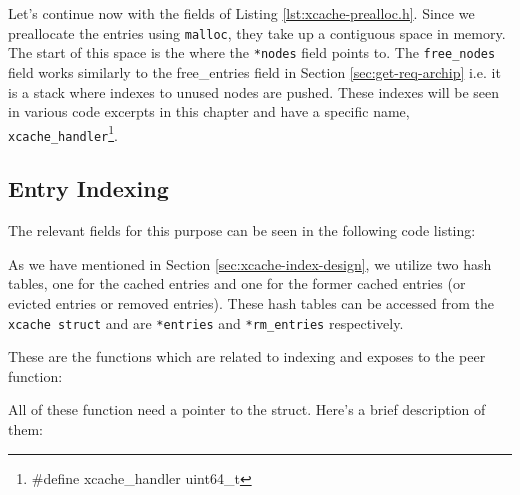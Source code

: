 Let's continue now with the fields of Listing \ref{lst:xcache-prealloc.h}.  
Since we preallocate the entries using \texttt{malloc}, they take up a 
contiguous space in memory.  The start of this space is the where the 
\texttt{*nodes} field points to. The \texttt{free\_nodes} field works similarly 
to the free\_entries field in Section \ref{sec:get-req-archip} i.e. it is a 
stack where indexes to unused nodes are pushed. These indexes will be seen in 
various code excerpts in this chapter and have a specific name, 
\texttt{xcache\_handler}\footnote{\#define xcache\_handler uint64\_t}.

\subsection{Entry Indexing}

The relevant fields for this purpose can be seen in the following code listing:


As we have mentioned in Section \ref{sec:xcache-index-design}, we utilize two 
hash tables, one for the cached entries and one for the former cached entries 
(or evicted entries or removed entries). These hash tables can be accessed from 
the \texttt{xcache struct} and are \texttt{*entries} and \texttt{*rm\_entries} 
respectively.

These are the functions which are related to indexing and \xcache exposes to the 
peer function:


All of these function need a pointer to the \xcache struct. Here's a brief 
description of them:

